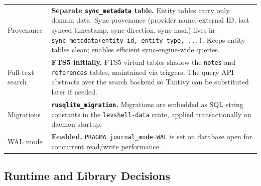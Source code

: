 \documentclass[11pt,a4paper]{article}
\begin{document}
\begin{longtable}{p{4.5cm} p{9cm}}
Provenance & \textbf{Separate \texttt{sync\_metadata} table.} Entity tables carry only domain data. Sync provenance (provider name, external ID, last synced timestamp, sync direction, sync hash) lives in \texttt{sync\_metadata(entity\_id, entity\_type, ...)}. Keeps entity tables clean; enables efficient sync-engine-wide queries. \\
\addlinespace
Full-text search & \textbf{FTS5 initially.} FTS5 virtual tables shadow the \texttt{notes} and \texttt{references} tables, maintained via triggers. The query API abstracts over the search backend so Tantivy can be substituted later if needed. \\
\addlinespace
Migrations & \textbf{\texttt{rusqlite\_migration}.} Migrations are embedded as SQL string constants in the \texttt{levshell-data} crate, applied transactionally on daemon startup. \\
\addlinespace
WAL mode & \textbf{Enabled.} \texttt{PRAGMA journal\_mode=WAL} is set on database open for concurrent read/write performance. \\
\bottomrule
\end{longtable}


\subsection{Runtime and Library Decisions}
\label{sec:runtime-decisions}
\end{document}
